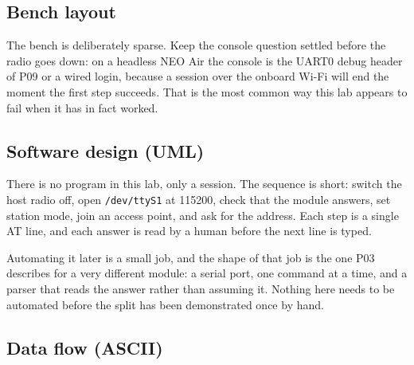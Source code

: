 \subsection*{Bench layout}


The bench is deliberately sparse. Keep the console question settled before the radio goes down: on a headless NEO Air the console is the UART0 debug header of P09 or a wired login, because a session over the onboard Wi-Fi will end the moment the first step succeeds. That is the most common way this lab appears to fail when it has in fact worked.

\subsection*{Software design (UML)}


There is no program in this lab, only a session. The sequence is short: switch the host radio off, open \texttt{/dev/ttyS1} at 115200, check that the module answers, set station mode, join an access point, and ask for the address. Each step is a single AT line, and each answer is read by a human before the next line is typed.

Automating it later is a small job, and the shape of that job is the one P03 describes for a very different module: a serial port, one command at a time, and a parser that reads the answer rather than assuming it. Nothing here needs to be automated before the split has been demonstrated once by hand.

\subsection*{Data flow (ASCII)}

